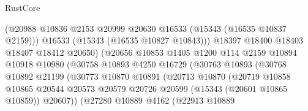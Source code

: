 \begin{lexlean}{RustCore}
\begin{coremodule}
                                      (@20988
                                        @10836
                                        @2153
                                        @20999
                                        @20630
                                        @16533
                                        (@15343 (@16535 @10837 @2159)))
                                      @16533
                                      (@15343 (@16535 @10827 @10843)))
                                    @18397
                                    @18400
                                    @18403
                                    @18407
                                    @18412
                                    @20650)
                                  (@20656
                                    @10853
                                    @1405
                                    @1200
                                    @114
                                    @2159
                                    @10894
                                    @10918
                                    @10980
                                    (@30758
                                      @10893
                                      @4250
                                      @16729
                                      (@30763
                                        @10893
                                        (@30768
                                          @10892
                                          @21199
                                          (@30773
                                            @10870
                                            @10891
                                            (@20713
                                              @10870
                                              (@20719
                                                @10858
                                                @10865
                                                @20544
                                                @20573
                                                @20579
                                                @20726
                                                @20599
                                                (@15343 (@20601 @10865 @10859))
                                                @20607))
                                            (@27280
                                              @10889
                                              @4162
                                              (@22913
                                                @10889

\end{coremodule}
\end{lexlean}
